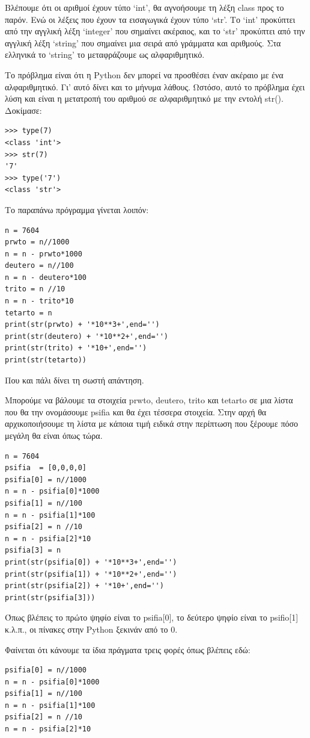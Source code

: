 \documentclass[b5paper,11pt,twoside,openleft]{memoir}
\begin{document}
Βλέπουμε ότι οι αριθμοί έχουν τύπο `int', θα αγνοήσουμε τη λέξη class προς το παρόν. Ενώ οι λέξεις που έχουν τα εισαγωγικά έχουν τύπο `str'. Το `int' προκύπτει από την αγγλική λέξη `integer' που σημαίνει ακέραιος, και το `str' προκύπτει από την αγγλική λέξη `string' που σημαίνει μια σειρά από γράμματα και αριθμούς. Στα ελληνικά το `string' το μεταφράζουμε ως αλφαριθμητικό.

Το πρόβλημα είναι ότι η Python δεν μπορεί να προσθέσει έναν ακέραιο με ένα αλφαριθμητικό. Γι' αυτό δίνει και το μήνυμα λάθους. Ωστόσο, αυτό το πρόβλημα έχει λύση και είναι η μετατροπή του αριθμού σε αλφαριθμητικό με την εντολή str().
Δοκίμασε:
\begin{lstlisting}
>>> type(7)
<class 'int'>
>>> str(7)
'7'
>>> type('7')
<class 'str'>
\end{lstlisting} 

Το παραπάνω πρόγραμμα γίνεται λοιπόν:
\begin{lstlisting}
n = 7604
prwto = n//1000
n = n - prwto*1000
deutero = n//100
n = n - deutero*100
trito = n //10
n = n - trito*10
tetarto = n
print(str(prwto) + '*10**3+',end='')
print(str(deutero) + '*10**2+',end='')
print(str(trito) + '*10+',end='')
print(str(tetarto))
\end{lstlisting}

Που και πάλι δίνει τη σωστή απάντηση.

Μπορούμε να βάλουμε τα στοιχεία prwto, deutero, trito και tetarto σε μια λίστα που θα την ονομάσουμε psifia και θα έχει τέσσερα στοιχεία. Στην αρχή θα αρχικοποιήσουμε τη λίστα με κάποια τιμή ειδικά στην περίπτωση που ξέρουμε πόσο μεγάλη θα είναι όπως τώρα.

\begin{lstlisting}
n = 7604
psifia  = [0,0,0,0]
psifia[0] = n//1000
n = n - psifia[0]*1000
psifia[1] = n//100
n = n - psifia[1]*100
psifia[2] = n //10
n = n - psifia[2]*10
psifia[3] = n
print(str(psifia[0]) + '*10**3+',end='')
print(str(psifia[1]) + '*10**2+',end='')
print(str(psifia[2]) + '*10+',end='')
print(str(psifia[3]))
\end{lstlisting}
Όπως βλέπεις το πρώτο ψηφίο είναι το psifia[0], το δεύτερο ψηφίο είναι το psifio[1] κ.λ.π., οι πίνακες στην Python ξεκινάν από το 0.

Φαίνεται ότι κάνουμε τα ίδια πράγματα τρεις φορές όπως βλέπεις εδώ:
\begin{lstlisting}
psifia[0] = n//1000
n = n - psifia[0]*1000
psifia[1] = n//100
n = n - psifia[1]*100
psifia[2] = n //10
n = n - psifia[2]*10
\end{lstlisting}
\end{document}
